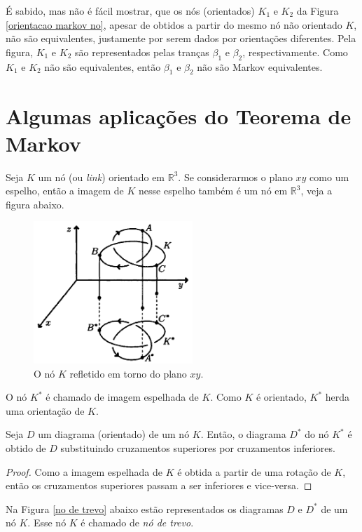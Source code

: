 \begin{remark}
		\par\vspace{0.3cm} É sabido, mas não é fácil mostrar, que os nós (orientados) $K_1$ e $K_2$ da Figura \eqref{orientacao markov no}, apesar de obtidos a partir do mesmo nó não orientado $K$, não são equivalentes, justamente por serem dados por orientações diferentes. Pela figura, $K_1$ e $K_2$ são representados pelas tranças $\beta_1$ e $\beta_2$, respectivamente. Como $K_1$ e $K_2$ não são equivalentes, então $\beta_1$ e $\beta_2$ não são Markov equivalentes.  
		
	\end{remark}
	\section{Algumas aplicações do Teorema de Markov}
	\hspace{12pt} Seja $K$ um nó (ou \textit{link}) orientado em $\mathbb{R}^3$. Se considerarmos o plano $xy$ como um espelho, então a imagem de $K$ nesse espelho também é um nó em $\mathbb{R}^3$, veja a figura abaixo.
	
	\begin{figure}[H]
		\begin{center}
			\includegraphics[width=6cm]{Images/no_espelhado.png}
		\end{center}\caption{O nó $K$ refletido em torno do plano $xy$.}\label{no espelhado}
	\end{figure}
	\par\vspace{0.3cm} O nó $K^\ast$ é chamado de imagem espelhada de $K$. Como $K$ é orientado, $K^\ast$ herda uma orientação de $K$.
	\begin{prop}
		\label{troca de cruzamentos}
		Seja $D$ um diagrama (orientado) de um nó $K$. Então, o diagrama $D^\ast$ do nó $K^\ast$ é obtido de $D$ substituindo cruzamentos superiores por cruzamentos inferiores.	
	\end{prop}
	\begin{proof}
		Como a imagem espelhada de $K$ é obtida a partir de uma rotação de $K$, então os cruzamentos superiores passam a ser inferiores e vice-versa.
	\end{proof}
	\par\vspace{0.3cm} Na Figura \eqref{no de trevo} abaixo estão representados os diagramas $D$ e $D^\ast$ de um nó $K$. Esse nó $K$ é chamado de \textit{nó de trevo}.
	
